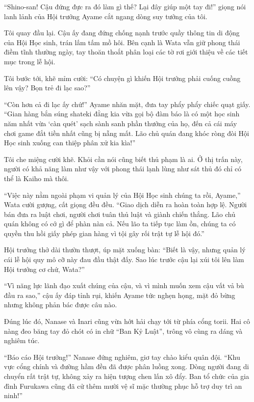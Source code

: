\documentclass[../main.tex]{subfiles}
\begin{document}
``Shino-san! Cậu đứng đực ra đó làm gì thế? Lại đây giúp một tay đi!'' giọng nói lanh lảnh của Hội trưởng Ayame cắt ngang dòng suy tưởng của tôi.

Tôi quay đầu lại. Cậu ấy đang đứng chống nạnh trước quầy thông tin di động của Hội Học sinh, trán lấm tấm mồ hôi. Bên cạnh là Wata vẫn giữ phong thái điềm tĩnh thường ngày, tay thoăn thoắt phân loại các tờ rơi giới thiệu về các tiết mục trong lễ hội.

Tôi bước tới, khẽ mỉm cười: ``Có chuyện gì khiến Hội trưởng phải cuống cuồng lên vậy? Bọn trẻ đi lạc sao?''

``Còn hơn cả đi lạc ấy chứ!'' Ayame nhăn mặt, đưa tay phẩy phẩy chiếc quạt giấy. ``Gian hàng bắn súng shateki đằng kia vừa gọi bộ đàm báo là có một học sinh năm nhất vừa `càn quét' sạch sành sanh phần thưởng của họ, đến cả cái máy chơi game đắt tiền nhất cũng bị nẫng mất. Lão chủ quán đang khóc ròng đòi Hội Học sinh xuống can thiệp phân xử kia kìa!''

Tôi che miệng cười khẽ. Khỏi cần nói cũng biết thủ phạm là ai. Ở thị trấn này, người có khả năng làm như vậy với phong thái lạnh lùng như sát thủ đó chỉ có thể là Kaiho mà thôi.

``Việc này nằm ngoài phạm vi quản lý của Hội Học sinh chúng ta rồi, Ayame,'' Wata cười gượng, cất giọng đều đều. ``Giao dịch diễn ra hoàn toàn hợp lệ. Người bán đưa ra luật chơi, người chơi tuân thủ luật và giành chiến thắng. Lão chủ quán không có cớ gì để phàn nàn cả. Nếu lão ta tiếp tục làm ồn, chúng ta có quyền thu hồi giấy phép gian hàng vì tội gây rối trật tự lễ hội đó.''

Hội trưởng thở dài thườn thượt, úp mặt xuống bàn: ``Biết là vậy, nhưng quản lý cái lễ hội quy mô cỡ này đau đầu thật đấy. Sao lúc trước cậu lại xúi tôi lên làm Hội trưởng cơ chứ, Wata?''

``Vì năng lực lãnh đạo xuất chúng của cậu, và vì mình muốn xem cậu vất vả bù đầu ra sao,'' cậu ấy đáp tỉnh rụi, khiến Ayame tức nghẹn họng, mặt đỏ bừng nhưng không phản bác được câu nào.

Đúng lúc đó, Nanase và Inari cũng vừa hớt hải chạy tới từ phía cổng torii. Hai cô nàng đeo băng tay đỏ chót có in chữ ``Ban Kỷ Luật'', trông vô cùng ra dáng và nghiêm túc.

``Báo cáo Hội trưởng!'' Nanase đứng nghiêm, giơ tay chào kiểu quân đội. ``Khu vực cổng chính và đường hầm đền đã được phân luồng xong. Dòng người đang di chuyển rất trật tự, không xảy ra hiện tượng chen lấn xô đẩy. Ban tổ chức của gia đình Furukawa cũng đã cử thêm mười vệ sĩ mặc thường phục hỗ trợ duy trì an ninh!''
\end{document}
